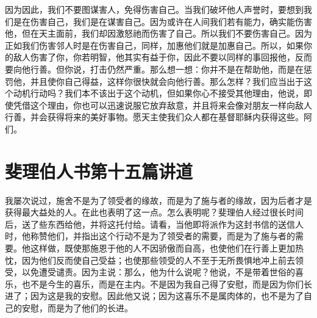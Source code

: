 因为因此，我们不要图谋害人，免得伤害自己。当我们破坏他人声誉时，要想到我们是在伤害自己，我们是在谋害自己。因为或许在人间我们若有能力，确实能伤害他，但在天主面前，我们却因激怒祂而伤害了自己。所以我们不要伤害自己。因为正如我们伤害邻人时是在伤害自己，同样，加惠他们就是加惠自己。所以，如果你的敌人伤害了你，你若明智，他其实有益于你，因此不要以同样的事回报他，反而要向他行善。但你说，打击仍然严重。那么想一想：你并不是在帮助他，而是在惩罚他，并且使你自己得益，这样你很快就会向他行善。那么怎样？我们应当出于这个动机行动吗？我们本不该出于这个动机，但如果你心不接受其他理由，他说，即使凭借这个理由，你也可以迅速说服它放弃敌意，并且将来会像对朋友一样向敌人行善，并会获得将来的美好事物。愿天主使我们众人都在基督耶稣内获得这些。阿们。\par



\section{斐理伯人书第十五篇讲道}

\par

\par

我屡次说过，施舍不是为了领受者的缘故，而是为了施与者的缘故，因为后者才是获得最大益处的人。在此也表明了这一点。怎么表明呢？斐理伯人经过很长时间后，送了些东西给他，并将这托付给。请看，当他即将派作为这封书信的送信人时，他称赞他们，并指出这个行动不是为了领受者的需要，而是为了施与者的需要。他这样做，既使那施恩于他的人不因骄傲而自高，也使他们在行善上更加热忱，因为他们反而使自己受益；也使那些领受的人不至于无所畏惧地冲上前去领受，以免遭受谴责。因为主说：那么，他为什么说呢？他说，不是带着世俗的喜乐，也不是今生的喜乐，而是在主内。不是因为我自己得了安慰，而是因为你们长进了；因为这是我的安慰。因此他又说；因为这喜乐不是属肉体的，也不是为了自己的安慰，而是为了他们的长进。\par

